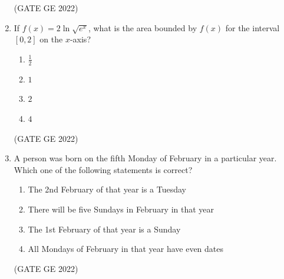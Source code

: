 \documentclass[a4paper, 11pt]{article}
\begin{document}
\begin{enumerate}
\hfill (GATE GE 2022)

\item If $f(x) = 2 \ln \sqrt{e^x}$, what is the area bounded by $f(x)$ for the interval $[0, 2]$ on the $x$-axis?
\begin{enumerate}
    \item $\frac{1}{2}$
    \item $1$
    \item $2$
    \item $4$
\end{enumerate}

\hfill (GATE GE 2022)

\item A person was born on the fifth Monday of February in a particular year. Which one of the following statements is correct?
\begin{enumerate}
    \item The 2nd February of that year is a Tuesday
    \item There will be five Sundays in February in that year
    \item The 1st February of that year is a Sunday
    \item All Mondays of February in that year have even dates
\end{enumerate}

\hfill (GATE GE 2022)


\end{enumerate}
\end{document}

